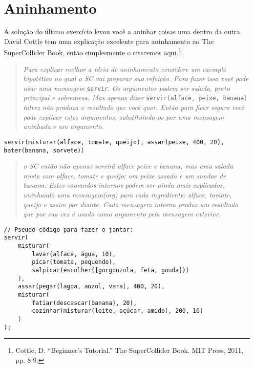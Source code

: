 \section{Aninhamento}
\label{sec:nesting}

A solução do último exercício levou você a aninhar coisas uma dentro da outra. David Cottle tem uma explicação excelente para aninhamento no The SuperCollider Book, então simplesmente o citaremos aqui.\footnote{Cottle, D. ``Beginner's Tutorial.'' The SuperCollider Book, MIT Press, 2011, pp. 8-9.}

\begin{quotation}
\textit{Para explicar melhor a ideia de aninhamento considere um exemplo hipotético no qual o SC vai preparar sua refeição. Para fazer isso você pode usar uma mensagem} \texttt{servir}. \textit{Os argumentos podem ser salada, prato principal e sobremesa. Mas apenas dizer} \texttt{servir(alface, peixe, banana)} \textit{talvez não produza o resultado que você quer. Então para ficar seguro você pode explicar estes argumentos, substituindo-os por uma mensagem aninhada e um argumento.}
\end{quotation}

\texttt{servir(misturar(alface, tomate, queijo), assar(peixe, 400, 20), bater(banana, sorvete))
}
\begin{quotation}
\textit{o SC então não apenas servirá alface peixe e banana, mas uma salada mista com alface, tomate e queijo; um peixe assado e um sundae de banana. Estes comandos internos podem ser ainda mais explicados, aninhando uma mensagem(arg) para cada ingrediente: alface, tomate, queijo e assim por diante. Cada mensagem interna produz um resultado que por sua vez é usado como argumento pela mensagem exterior.}
\end{quotation}

\begin{lstlisting}[style=SuperCollider-IDE, basicstyle=\scttfamily\footnotesize, label=code-dinner]
// Pseudo-código para fazer o jantar: 
servir(
	misturar(
		lavar(alface, água, 10),
		picar(tomate, pequendo),
		salpicar(escolher([gorgonzola, feta, gouda]))
	),
	assar(pegar(lagoa, anzol, vara), 400, 20),
	misturar(
		fatiar(descascar(banana), 20),
		cozinhar(misturar(leite, açúcar, amido), 200, 10)
	)
);
\end{lstlisting}

